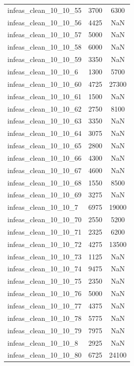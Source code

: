\begin{longtable}{lcc}
infeas\_clean\_10\_10\_55  &     3700 &   6300 \\
infeas\_clean\_10\_10\_56  &     4425 &    NaN \\
infeas\_clean\_10\_10\_57  &     5000 &    NaN \\
infeas\_clean\_10\_10\_58  &     6000 &    NaN \\
infeas\_clean\_10\_10\_59  &     3350 &    NaN \\
infeas\_clean\_10\_10\_6   &     1300 &   5700 \\
infeas\_clean\_10\_10\_60  &     4725 &  27300 \\
infeas\_clean\_10\_10\_61  &     1500 &    NaN \\
infeas\_clean\_10\_10\_62  &     2750 &   8100 \\
infeas\_clean\_10\_10\_63  &     3350 &    NaN \\
infeas\_clean\_10\_10\_64  &     3075 &    NaN \\
infeas\_clean\_10\_10\_65  &     2800 &    NaN \\
infeas\_clean\_10\_10\_66  &     4300 &    NaN \\
infeas\_clean\_10\_10\_67  &     4600 &    NaN \\
infeas\_clean\_10\_10\_68  &     1550 &   8500 \\
infeas\_clean\_10\_10\_69  &     3275 &    NaN \\
infeas\_clean\_10\_10\_7   &     6975 &  19000 \\
infeas\_clean\_10\_10\_70  &     2550 &   5200 \\
infeas\_clean\_10\_10\_71  &     2325 &   6200 \\
infeas\_clean\_10\_10\_72  &     4275 &  13500 \\
infeas\_clean\_10\_10\_73  &     1125 &    NaN \\
infeas\_clean\_10\_10\_74  &     9475 &    NaN \\
infeas\_clean\_10\_10\_75  &     2350 &    NaN \\
infeas\_clean\_10\_10\_76  &     5000 &    NaN \\
infeas\_clean\_10\_10\_77  &     4375 &    NaN \\
infeas\_clean\_10\_10\_78  &     5775 &    NaN \\
infeas\_clean\_10\_10\_79  &     7975 &    NaN \\
infeas\_clean\_10\_10\_8   &     2925 &    NaN \\
infeas\_clean\_10\_10\_80  &     6725 &  24100 \\

\end{longtable}
